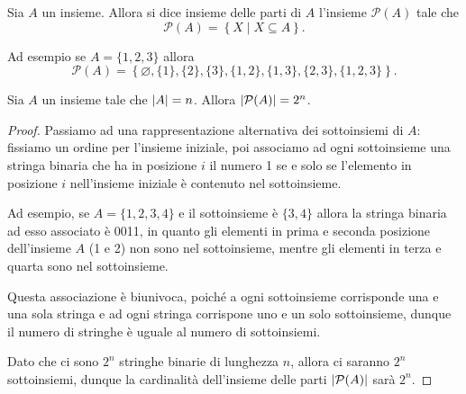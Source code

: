 \begin{definition}
    Sia $A$ un insieme. Allora si dice insieme delle parti di $A$ l'insieme $\mathcal{P}(A)$ tale che \[
        \mathcal{P}(A) = \left\{ X \mid X \subseteq A\right\}    
    .\]
\end{definition}

Ad esempio se $A = \{1, 2, 3\}$ allora \[
    \mathcal{P}(A) = \left\{ \varnothing, \{1\}, \{2\}, \{3\}, \{1, 2\}, \{1, 3\}, \{2, 3\}, \{1, 2, 3\} \right\}.
\]

\begin{proposition}
    Sia $A$ un insieme tale che $\left|A\right| = n$. Allora $\left|\mathcal{P}(A)\right| = 2^n$.
\end{proposition}
\begin{proof}
    Passiamo ad una rappresentazione alternativa dei sottoinsiemi di $A$: fissiamo un ordine per l'insieme iniziale, poi associamo ad ogni sottoinsieme una stringa binaria che ha in posizione $i$ il numero 1 se e solo se l'elemento in posizione $i$ nell'insieme iniziale è contenuto nel sottoinsieme.

    Ad esempio, se $A = \{1, 2, 3, 4\}$ e il sottoinsieme è $\{3, 4\}$ allora la stringa binaria ad esso associato è 0011, in quanto gli elementi in prima e seconda posizione dell'insieme $A$ (1 e 2) non sono nel sottoinsieme, mentre gli elementi in terza e quarta sono nel sottoinsieme. 

    Questa associazione è biunivoca, poiché a ogni sottoinsieme corrisponde una e una sola stringa e ad ogni stringa corrispone uno e un solo sottoinsieme, dunque il numero di stringhe è uguale al numero di sottoinsiemi.

    Dato che ci sono $2^n$ stringhe binarie di lunghezza $n$, allora ci saranno $2^n$ sottoinsiemi, dunque la cardinalità dell'insieme delle parti $\left|\mathcal{P}(A)\right|$ sarà $2^n$.
\end{proof}

